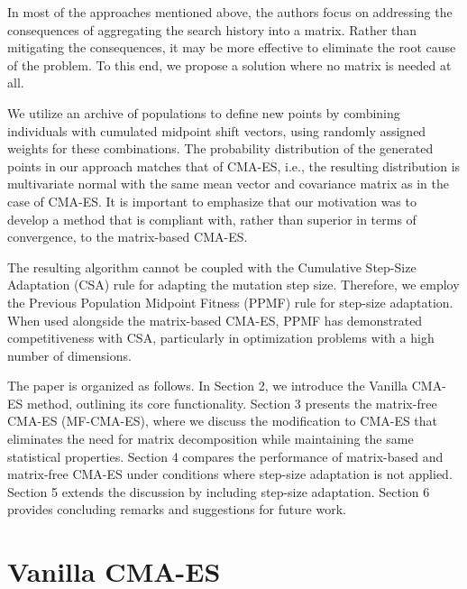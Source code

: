 \documentclass[dvipsnames,format=sigconf,anonymous=false,review=false]{acmart}
\begin{document}
In most of the approaches mentioned above, the authors focus on addressing the consequences of aggregating the search history into a matrix. Rather than mitigating the consequences, it may be more effective to eliminate the root cause of the problem. To this end, we propose a solution where no matrix is needed at all.

We utilize an archive of populations to define new points by combining individuals with cumulated midpoint shift vectors, using randomly assigned weights for these combinations. The probability distribution of the generated points in our approach matches that of CMA-ES, i.e., the resulting distribution is multivariate normal with the same mean vector and covariance matrix as in the case of CMA-ES. It is important to emphasize that our motivation was to develop a method that is compliant with, rather than superior in terms of convergence, to the matrix-based CMA-ES.

The resulting algorithm cannot be coupled with the Cumulative Step-Size Adaptation (CSA) rule for adapting the mutation step size. Therefore, we employ the Previous Population Midpoint Fitness (PPMF) rule \cite{Warchulski2021} for step-size adaptation. When used alongside the matrix-based CMA-ES, PPMF has demonstrated competitiveness with CSA, particularly in optimization problems with a high number of dimensions.

The paper is organized as follows. In Section 2, we introduce the Vanilla CMA-ES method, outlining its core functionality. Section 3 presents the matrix-free CMA-ES (MF-CMA-ES), where we discuss the modification to CMA-ES that eliminates the need for matrix decomposition while maintaining the same statistical properties. Section 4 compares the performance of matrix-based and matrix-free CMA-ES under conditions where step-size adaptation is not applied. Section 5 extends the discussion by including step-size adaptation. Section 6 provides concluding remarks and suggestions for future work.

\section{Vanilla CMA-ES}
\end{document}

